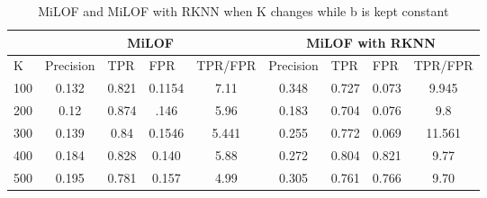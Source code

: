 \begin{table}[H]
	\centering
	\caption{MiLOF and MiLOF with RKNN when K changes while b is kept constant}
	
	\label{my-label}
	\begin{tabular}{|c|c|c|c|c|c|c|c|c|}
		\hline
		\multicolumn{1}{|l|}{}    & \multicolumn{4}{c|}{MiLOF}                                                                                                    & \multicolumn{4}{c|}{MiLOF with RKNN}                                                                                          \\ \hline
		\multicolumn{1}{|l|}{K}   & \multicolumn{1}{l|}{Precision} & \multicolumn{1}{l|}{TPR} & \multicolumn{1}{l|}{FPR} & \multicolumn{1}{l|}{TPR/FPR} & \multicolumn{1}{l|}{Precision} & \multicolumn{1}{l|}{TPR} & \multicolumn{1}{l|}{FPR} & \multicolumn{1}{l|}{TPR/FPR} \\ \hline
		\multicolumn{1}{|l|}{100} & 0.132                          & 0.821                              & 0.1154                   & 7.11                         & 0.348                          & 0.727                              & 0.073                    & 9.945                        \\ \hline
		200                       & 0.12                           & 0.874                              & .146                     & 5.96                         & 0.183                          & 0.704                              & 0.076                    & 9.8                          \\ \hline
		300                       & 0.139                          & 0.84                               & 0.1546                   & 5.441                        & 0.255                          & 0.772                              & 0.069                    & 11.561                       \\ \hline
		400                       & 0.184                          & 0.828                              & 0.140                    & 5.88                         & 0.272                          & 0.804                              & 0.821                    & 9.77                         \\ \hline
		500                       & 0.195                          & 0.781                              & 0.157                    & 4.99                         & 0.305                          & 0.761                              & 0.766                    & 9.70                         \\ \hline

\end{tabular}
\end{table}
